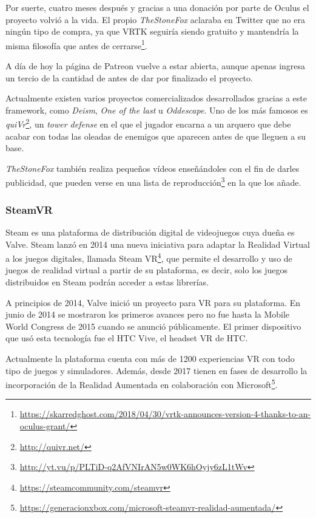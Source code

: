 Por suerte, cuatro meses después y gracias a una donación por parte de Oculus el proyecto volvió a la vida. El propio \textit{TheStoneFox} aclaraba en Twitter que no era ningún tipo de compra, ya que \acs{VRTK} seguiría siendo gratuito y mantendría la misma filosofía que antes de cerrarse\footnote{\url{https://skarredghost.com/2018/04/30/vrtk-announces-version-4-thanks-to-an-oculus-grant/}}.

A día de hoy la página de Patreon vuelve a estar abierta, aunque apenas ingresa un tercio de la cantidad de antes de dar por finalizado el proyecto.

Actualmente existen varios proyectos comercializados desarrollados gracias a este framework, como \textit{Deism}, \textit{One of the last} u \textit{Oddescape}. Uno de los más famosos es \textit{quiVr}\footnote{\url{http://quivr.net/}}, un \textit{tower defense} en el que el jugador encarna a un arquero que debe acabar con todas las oleadas de enemigos que aparecen antes de que lleguen a su base.

\textit{TheStoneFox} también realiza pequeños vídeos enseñándoles con el fin de darles publicidad, que pueden verse en una lista de reproducción\footnote{\url{http://yt.vu/p/PLTiD-q2AfVNIrAN5w0WK6hOyjy6zL1tWv}} en la que los añade. 

\subsubsection{SteamVR}

Steam es una plataforma de distribución digital de videojuegos cuya dueña es Valve. Steam lanzó en 2014 una nueva iniciativa para adaptar la Realidad Virtual a los juegos digitales, llamada Steam VR\footnote{\url{https://steamcommunity.com/steamvr}}, que permite el desarrollo y uso de juegos de realidad virtual a partir de su plataforma, es decir, solo los juegos distribuidos en Steam podrán acceder a estas librerías.

A principios de  2014, Valve inició un proyecto para \acs{VR} para su plataforma. En junio de 2014 se mostraron los primeros avances pero no fue hasta la Mobile World Congress de 2015 cuando se anunció públicamente. El primer dispositivo que usó esta tecnología fue el HTC Vive, el headset \acs{VR} de HTC.

Actualmente la plataforma cuenta con más de 1200 experiencias \acs{VR} con todo tipo de juegos y simuladores. Además, desde 2017 tienen en fases de desarrollo la incorporación de la Realidad Aumentada en colaboración con Microsoft\footnote{\url{https://generacionxbox.com/microsoft-steamvr-realidad-aumentada/}}.

